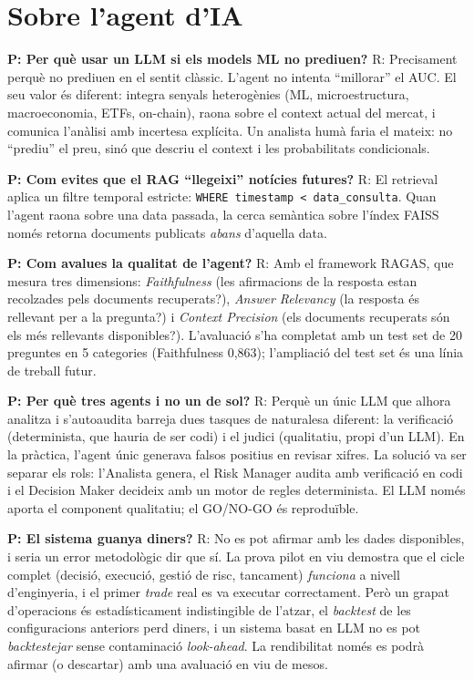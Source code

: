 \documentclass[12pt, a4paper]{report}
\begin{document}
\section*{Sobre l'agent d'IA}

\textbf{P: Per què usar un LLM si els models ML no prediuen?}
R: Precisament perquè no prediuen en el sentit clàssic. L'agent no intenta ``millorar'' el AUC. El seu valor és diferent: integra senyals heterogènies (ML, microestructura, macroeconomia, ETFs, on-chain), raona sobre el context actual del mercat, i comunica l'anàlisi amb incertesa explícita. Un analista humà faria el mateix: no ``prediu'' el preu, sinó que descriu el context i les probabilitats condicionals.

\textbf{P: Com evites que el RAG ``llegeixi'' notícies futures?}
R: El retrieval aplica un filtre temporal estricte: \texttt{WHERE timestamp < data\_consulta}. Quan l'agent raona sobre una data passada, la cerca semàntica sobre l'índex FAISS només retorna documents publicats \textit{abans} d'aquella data.

\textbf{P: Com avalues la qualitat de l'agent?}
R: Amb el framework RAGAS, que mesura tres dimensions: \textit{Faithfulness} (les afirmacions de la resposta estan recolzades pels documents recuperats?), \textit{Answer Relevancy} (la resposta és rellevant per a la pregunta?) i \textit{Context Precision} (els documents recuperats són els més rellevants disponibles?). L'avaluació s'ha completat amb un test set de 20 preguntes en 5 categories (Faithfulness 0,863); l'ampliació del test set és una línia de treball futur.

\textbf{P: Per què tres agents i no un de sol?}
R: Perquè un únic LLM que alhora analitza i s'autoaudita barreja dues tasques de naturalesa diferent: la verificació (determinista, que hauria de ser codi) i el judici (qualitatiu, propi d'un LLM). En la pràctica, l'agent únic generava falsos positius en revisar xifres. La solució va ser separar els rols: l'Analista genera, el Risk Manager audita amb verificació en codi i el Decision Maker decideix amb un motor de regles determinista. El LLM només aporta el component qualitatiu; el GO/NO-GO és reproduïble.

\textbf{P: El sistema guanya diners?}
R: No es pot afirmar amb les dades disponibles, i seria un error metodològic dir que sí. La prova pilot en viu demostra que el cicle complet (decisió, execució, gestió de risc, tancament) \emph{funciona} a nivell d'enginyeria, i el primer \textit{trade} real es va executar correctament. Però un grapat d'operacions és estadísticament indistingible de l'atzar, el \textit{backtest} de les configuracions anteriors perd diners, i un sistema basat en LLM no es pot \textit{backtestejar} sense contaminació \textit{look-ahead}. La rendibilitat només es podrà afirmar (o descartar) amb una avaluació en viu de mesos.
\end{document}
